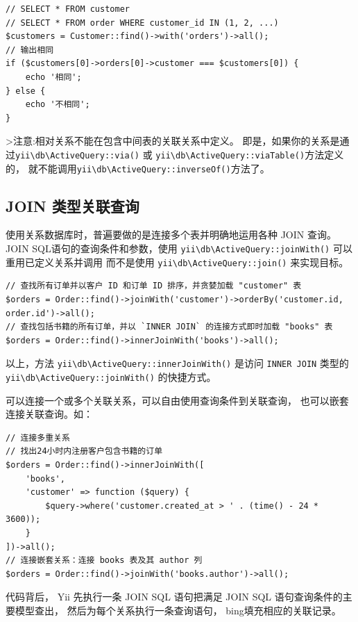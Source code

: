 \lstset{language=php}\begin{lstlisting}
// SELECT * FROM customer
// SELECT * FROM order WHERE customer_id IN (1, 2, ...)
$customers = Customer::find()->with('orders')->all();
// 输出相同
if ($customers[0]->orders[0]->customer === $customers[0]) {
    echo '相同';
} else {
    echo '不相同';
}
\end{lstlisting}
>注意:相对关系不能在包含中间表的关联关系中定义。 即是，如果你的关系是通过\texttt{yii{\allowbreak{}\textbackslash}db{\allowbreak{}\textbackslash}ActiveQuery\allowbreak{}::\allowbreak{}via()} 或 \texttt{yii{\allowbreak{}\textbackslash}db{\allowbreak{}\textbackslash}ActiveQuery\allowbreak{}::\allowbreak{}viaTable()}方法定义的， 就不能调用\texttt{yii{\allowbreak{}\textbackslash}db{\allowbreak{}\textbackslash}ActiveQuery\allowbreak{}::\allowbreak{}inverseOf()}方法了。

\subsection{ JOIN 类型关联查询}
使用关系数据库时，普遍要做的是连接多个表并明确地运用各种 JOIN 查询。
JOIN SQL语句的查询条件和参数，使用 \texttt{yii{\allowbreak{}\textbackslash}db{\allowbreak{}\textbackslash}ActiveQuery\allowbreak{}::\allowbreak{}joinWith()}
可以重用已定义关系并调用
而不是使用 \texttt{yii{\allowbreak{}\textbackslash}db{\allowbreak{}\textbackslash}ActiveQuery\allowbreak{}::\allowbreak{}join()} 来实现目标。

\lstset{language=php}\begin{lstlisting}
// 查找所有订单并以客户 ID 和订单 ID 排序，并贪婪加载 "customer" 表
$orders = Order::find()->joinWith('customer')->orderBy('customer.id, order.id')->all();
// 查找包括书籍的所有订单，并以 `INNER JOIN` 的连接方式即时加载 "books" 表
$orders = Order::find()->innerJoinWith('books')->all();
\end{lstlisting}
以上，方法 \texttt{yii{\allowbreak{}\textbackslash}db{\allowbreak{}\textbackslash}ActiveQuery\allowbreak{}::\allowbreak{}innerJoinWith()} 是访问 \lstinline|INNER JOIN| 类型的  \texttt{yii{\allowbreak{}\textbackslash}db{\allowbreak{}\textbackslash}ActiveQuery\allowbreak{}::\allowbreak{}joinWith()} 的快捷方式。

可以连接一个或多个关联关系，可以自由使用查询条件到关联查询，
也可以嵌套连接关联查询。如：

\lstset{language=php}\begin{lstlisting}
// 连接多重关系
// 找出24小时内注册客户包含书籍的订单
$orders = Order::find()->innerJoinWith([
    'books',
    'customer' => function ($query) {
        $query->where('customer.created_at > ' . (time() - 24 * 3600));
    }
])->all();
// 连接嵌套关系：连接 books 表及其 author 列
$orders = Order::find()->joinWith('books.author')->all();
\end{lstlisting}
代码背后， Yii 先执行一条 JOIN SQL 语句把满足 JOIN SQL 语句查询条件的主要模型查出，
然后为每个关系执行一条查询语句，
bing填充相应的关联记录。

